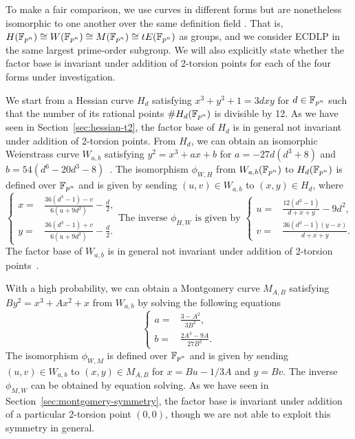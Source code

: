 %
%


%
To make a fair comparison, we use curves in different forms but are
nonetheless isomorphic to one another over the same definition field
.
%
That is, $H(\mathbb F_{p^n})\cong W(\mathbb F_{p^n})\cong M(\mathbb F_{p^n})\cong tE(\mathbb F_{p^n})$
as groups, and we consider ECDLP in the same largest prime-order
subgroup.
%
We will also explicitly state whether the factor base is invariant
under addition of 2-torsion points for each of the four forms under
investigation.

We start from a Hessian curve $H_d$ satisfying $x^3 + y^3 + 1 = 3dxy$
for $d\in\mathbb F_{p^n}$ such that the number of its rational points
$\#H_d(\mathbb F_{p^n})$ is divisible by 12.
%
As we have seen in Section~\ref{sec:hessian-t2}, the factor base of
$H_d$ is in general not invariant under addition of 2-torsion points.
%
From $H_d$, we can obtain an isomorphic Weierstrass curve $W_{a,b}$
satisfying $y^2 = x^3 + ax + b$ for $a = - 27d(d^3 + 8)$ and
$b = 54(d^6 - 20d^3 - 8)$~\cite{DBLP:conf/ches/Smart01}.
%
The isomorphism $\phi_{W,H}$ from $W_{a,b}(\mathbb F_{p^n})$ to $H_d(\mathbb F_{p^n})$
is defined over $\mathbb F_{p^n}$ and is given by sending $(u,v)\in W_{a,b}$
to $(x,y)\in H_d$, where
\[ \left\{\begin{aligned}
      x = & \frac{36(d^3 - 1) - v}{6(u + 9d^2)} - \frac{d}{2}, \\
      y = & \frac{36(d^3 - 1) + v}{6(u + 9d^2)} - \frac{d}{2}.
    \end{aligned}\right. \text{The inverse $\phi_{H,W}$ is given by }
  \left\{\begin{aligned}
      u = & \frac{12(d^3 - 1)}{d + x + y} - 9d^2, \\
      v = & \frac{36(d^3 - 1)(y - x)}{d + x + y}.
    \end{aligned}\right. \]
%
The factor base of $W_{a,b}$ is in general not invariant under
addition of 2-torsion points~\cite{DBLP:journals/joc/FaugereGHR14}.

With a high probability, we can obtain a Montgomery curve $M_{A,B}$
satisfying $By^2 = x^3 + Ax^2 + x$ from $W_{a,b}$ by solving the
following equations
%
\[ \left\{\begin{aligned}
a = & \frac{3 - A^2}{3B^2}, \\
b = & \frac{2A^3 - 9A}{27B^3}.
\end{aligned}\right. \]
%
The isomorphism $\phi_{W,M}$ is defined over $\mathbb F_{p^n}$ and is given by
sending $(u,v)\in W_{a,b}$ to $(x,y)\in M_{A,B}$ for $x = Bu - 1/3A$
and $y = Bv$.
%
The inverse $\phi_{M,W}$ can be obtained by equation solving.
%
As we have seen in Section~\ref{sec:montgomery-symmetry}, the factor
base is invariant under addition of a particular 2-torsion point
$(0,0)$, though we are not able to exploit this symmetry in general.

